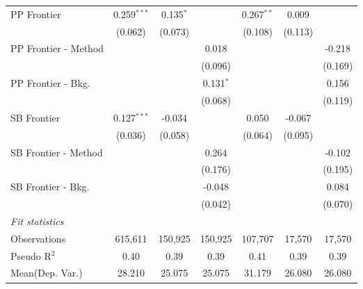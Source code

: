 \begin{tabular}{lcccccc}
   PP Frontier          & 0.259$^{***}$ & 0.135$^{*}$   &               & 0.267$^{**}$  & 0.009        &   \\   
                        & (0.062)       & (0.073)       &               & (0.108)       & (0.113)      &   \\   
   PP Frontier - Method &               &               & 0.018         &               &              & -0.218\\   
                        &               &               & (0.096)       &               &              & (0.169)\\   
   PP Frontier - Bkg.   &               &               & 0.131$^{*}$   &               &              & 0.156\\   
                        &               &               & (0.068)       &               &              & (0.119)\\   
   SB Frontier          & 0.127$^{***}$ & -0.034        &               & 0.050         & -0.067       &   \\   
                        & (0.036)       & (0.058)       &               & (0.064)       & (0.095)      &   \\   
   SB Frontier - Method &               &               & 0.264         &               &              & -0.102\\   
                        &               &               & (0.176)       &               &              & (0.195)\\   
   SB Frontier - Bkg.   &               &               & -0.048        &               &              & 0.084\\   
                        &               &               & (0.042)       &               &              & (0.070)\\   
   \midrule
   \emph{Fit statistics}\\
   Observations         & 615,611       & 150,925       & 150,925       & 107,707       & 17,570       & 17,570\\  
   Pseudo R$^2$         & 0.40          & 0.39          & 0.39          & 0.41          & 0.39         & 0.39\\  
Mean(Dep. Var.) & 28.210 & 25.075 & 25.075 & 31.179 & 26.080 & 26.080 \\
   

\end{tabular}
